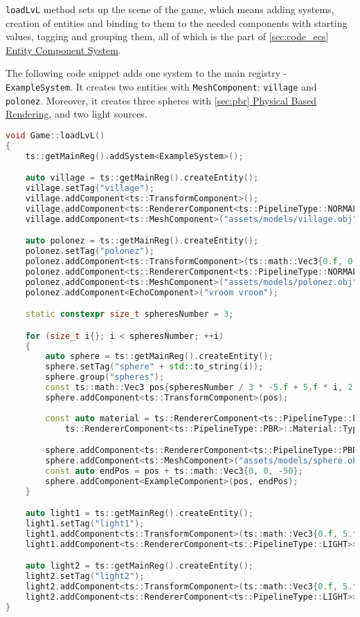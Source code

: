 \texttt{loadLvL} method sets up the scene of the game, which means adding systems, creation of entities and binding to them to the needed components with starting values, tagging and grouping them, all of which is the part of \hyperref[sec:code_ecs]{\ref*{sec:code_ecs} Entity Component System}.

The following code snippet adds one system to the main registry - \texttt{ExampleSystem}. It creates two entities with \texttt{MeshComponent}: \texttt{village} and \texttt{polonez}. Moreover, it creates three spheres with \hyperref[sec:pbr]{\ref*{sec:pbr} Physical Based Rendering}, and two light sources.
\begin{lstlisting}[language=c++, caption=An example of a game load level function (./game/game.cpp)]
void Game::loadLvL()
{
    ts::getMainReg().addSystem<ExampleSystem>();

    auto village = ts::getMainReg().createEntity();
    village.setTag("village");
    village.addComponent<ts::TransformComponent>();
    village.addComponent<ts::RendererComponent<ts::PipelineType::NORMAL_LIGHTING>>();
    village.addComponent<ts::MeshComponent>("assets/models/village.obj");

    auto polonez = ts::getMainReg().createEntity();
    polonez.setTag("polonez");
    polonez.addComponent<ts::TransformComponent>(ts::math::Vec3{0.f, 0.f, -10.f});
    polonez.addComponent<ts::RendererComponent<ts::PipelineType::NORMAL_LIGHTING>>();
    polonez.addComponent<ts::MeshComponent>("assets/models/polonez.obj");
    polonez.addComponent<EchoComponent>("vroom vroom");

    static constexpr size_t spheresNumber = 3;

    for (size_t i{}; i < spheresNumber; ++i)
    {
        auto sphere = ts::getMainReg().createEntity();
        sphere.setTag("sphere" + std::to_string(i));
        sphere.group("spheres");
        const ts::math::Vec3 pos{spheresNumber / 3 * -5.f + 5.f * i, 2.f, -5.f};
        sphere.addComponent<ts::TransformComponent>(pos);
     
        const auto material = ts::RendererComponent<ts::PipelineType::PBR>::Material::create(
            ts::RendererComponent<ts::PipelineType::PBR>::Material::Type::GOLD);

        sphere.addComponent<ts::RendererComponent<ts::PipelineType::PBR>>(material);
        sphere.addComponent<ts::MeshComponent>("assets/models/sphere.obj");
        const auto endPos = pos + ts::math::Vec3{0, 0, -50};
        sphere.addComponent<ExampleComponent>(pos, endPos);
    }

    auto light1 = ts::getMainReg().createEntity();
    light1.setTag("light1");
    light1.addComponent<ts::TransformComponent>(ts::math::Vec3{0.f, 5.f, -7.f});
    light1.addComponent<ts::RendererComponent<ts::PipelineType::LIGHT>>();

    auto light2 = ts::getMainReg().createEntity();
    light2.setTag("light2");
    light2.addComponent<ts::TransformComponent>(ts::math::Vec3{0.f, 5.f,  0.f});
    light2.addComponent<ts::RendererComponent<ts::PipelineType::LIGHT>>();
}
\end{lstlisting}
